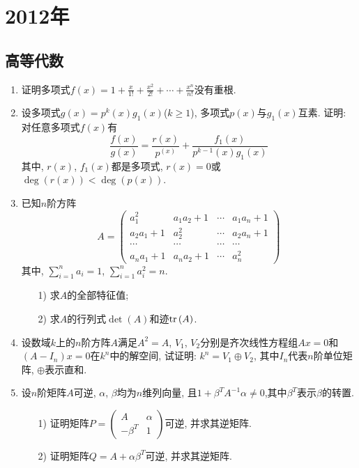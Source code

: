 \documentclass[12pt,a4paper,openany]{book}
\newcommand\tr{\text{tr\,}}
\begin{document}
\section{2012年}
\subsection{高等代数}
\begin{enumerate}
\item 证明多项式$f(x) = 1 + \frac{x}{1!} + \frac{x^2}{2!} + \cdots + \frac{x^n}{n!}$没有重根.
\item 设多项式$g(x) = p^k(x)g_1(x)$($k \ge 1$), 多项式$p(x)$与$g_1(x)$互素. 证明: 对任意多项式$f(x)$有
$$
\frac{f(x)}{g(x)} = \frac{r(x)}{p^(x)} + \frac{f_1(x)}{p^{k-1}(x)g_1(x)}
$$
其中, $r(x)$, $f_1(x)$都是多项式, $r(x) = 0$或$\deg(r(x)) < \deg(p(x))$.

\item 已知$n$阶方阵
$$
A = \begin{pmatrix}
a_1^2 & a_1a_2 + 1 & \cdots & a_1a_n + 1 \\
a_2a_1 + 1 & a_2^2 & \cdots & a_2a_n + 1 \\
\cdots & \cdots & \cdots & \cdots \\
a_na_1 + 1 & a_na_2+1 & \cdots & a_n^2
\end{pmatrix}
$$
其中, $\sum_{i=1}^{n}{a_i} = 1$, $\sum_{i=1}^{n}{a_i^2} = n$.
\begin{enumerate}
\item[1)]求$A$的全部特征值;
\item[2)]求$A$的行列式$\det(A)$和迹$\tr(A)$.
\end{enumerate}
\item 设数域$k$上的$n$阶方阵$A$满足$A^2 = A$, $V_1$, $V_2$分别是齐次线性方程组$Ax = 0$和$(A - I_n)x = 0$在$k^n$中的解空间, 试证明: $k^n = V_1 \oplus V_2$, 其中$I_n$代表$n$阶单位矩阵, $\oplus$表示直和.

\item 设$n$阶矩阵$A$可逆, $\alpha$, $\beta$均为$n$维列向量, 且$1 + \beta^TA^{-1}\alpha \neq 0$,其中$\beta^T$表示$\beta$的转置.
\begin{enumerate}
\item[1)] 证明矩阵$P = \begin{pmatrix}A & \alpha \\ -\beta^T & 1\end{pmatrix}$可逆, 并求其逆矩阵.

\item[2)] 证明矩阵$Q = A + \alpha\beta^T$可逆, 并求其逆矩阵.
\end{enumerate}


\end{enumerate}
\end{document}
